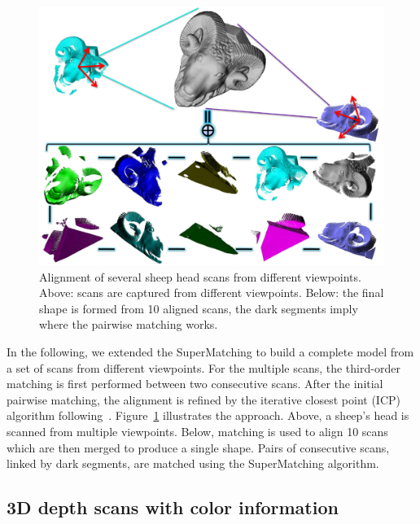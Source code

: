 \begin{figure}[htb]
\centering
  \includegraphics[width=0.99\linewidth]{figures/3DRigid.pdf}
  \caption{Alignment of several sheep head scans from different viewpoints.
  Above: scans are captured from different viewpoints. Below: the final shape is formed from 10 aligned scans, the dark segments imply where the pairwise matching works.}
\label{fig:3DRigid}
\end{figure}

In the following, we extended the SuperMatching to build a complete model from a set of scans from different viewpoints.
For the multiple scans, the third-order matching is first performed between two consecutive scans.
After the initial pairwise matching, the alignment is refined by the iterative closest point (ICP) algorithm following~\cite{Gelfand05}.
Figure~\ref{fig:3DRigid} illustrates the approach.
Above, a sheep's head is scanned from multiple viewpoints. Below, matching is used to align 10 scans which are then merged to produce a single shape.
Pairs of consecutive scans, linked by dark segments, are matched using the SuperMatching algorithm.


\subsection{3D depth scans with color information}
\label{subsec:3dColored}

